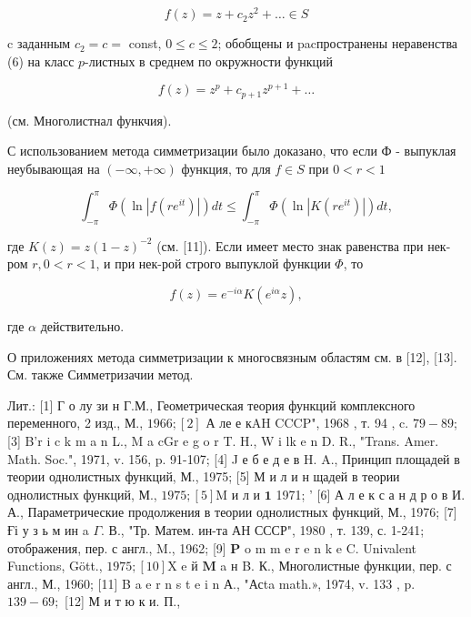 \documentclass[10pt]{article}
\begin{document}
\[

f(z)=z+c_{2} z^{2}+\ldots \in S

\]



c заданным $c_{2}=c=$ const, $0 \leqslant c \leqslant 2$; обобщены и pacпространены неравенства (6) на класс $p$-листных в среднем по окружности функций



\[

f(z)=z^{p}+c_{p+1} z^{p+1}+\ldots

\]



(см. Многолистнал функчия).



С использованием метода симметризации было доказано, что если Ф - выпуклая неубывающая на $(-\infty,+\infty)$ функция, то для $f \in S$ при $0<r<1$



\[

\int_{-\pi}^{\pi} \Phi\left(\ln \left|f\left(r e^{i t}\right)\right|\right) d t \leqslant \int_{-\pi}^{\pi} \Phi\left(\ln \left|K\left(r e^{i t}\right)\right|\right) d t,

\]



где $K(z)=z(1-z)^{-2}$ (см. [11]). Если имеет место знак равенства при нек-ром $r, 0<r<1$, и при нек-рой строго выпуклой функции $\Phi$, то



\[

f(z)=e^{-i \alpha} K\left(e^{i \alpha} z\right),

\]



где $\alpha$ действительно.



О приложениях метода симметризации к многосвязным областям см. в [12], [13]. См. также Симметризачии метод.



Лит.: [1] Г о лу зи н Г.М., Геометрическая теория функций комплексного переменного, 2 изд., М., $1966 ;[2]$ А ле е кAH CCCP", 1968 , т. 94 , c. $79-89$; [3] B'r i c k m a n L., M a cGr e g o r T. H., W i lk e n D. R., "Trans. Amer. Math. Soc.", 1971, v. 156, p. 91-107; [4] J е б е д е в H. A., Принцип площадей в теории однолистных функций, М., 1975; [5] М и л и н щадей в теории однолистных функций, М., $1975 ;[5] \mathrm{M}$ и л и $\mathbf{1}$ 1971; ' [6] А л е к с а н д р о в И. А., Параметрические продолжения в теории однолистных функций, М., 1976; [7] Ғі у з ь м ин a $\Gamma$. В., "Тр. Матем. ин-та АН СССР", 1980 , т. 139, с. 1-241; отображения, пер. с англ., M., 1962; [9] $\mathbf{P}$ o m m e r e n k e $\mathrm{C}$. Univalent Functions, Gött., $1975 ;[10] \mathrm{X}$ e й $\mathbf{M}$ a н B. К., Многолистные функции, пер. с англ., М., 1960; [11] B a e r n s t e i n А., "Асta math.», 1974, v. 133 , p. $139-69 ;$ [12] М и т ю к и. П.,
\end{document}
